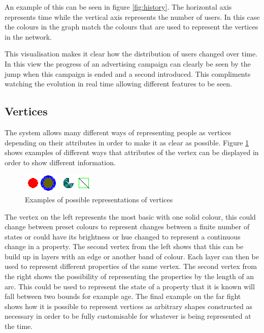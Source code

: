 \documentclass[12pt,a4paper]{article}
\begin{document}
An example of this can be seen in figure \ref{fig:history}. The horizontal axis represents time while the vertical axis represents the number of users. In this case the colours in the graph match the colours that are used to represent the vertices in the network.

This visualisation makes it clear how the distribution of users changed over time. In this view the progress of an advertising campaign can clearly be seen by the jump when this campaign is ended and a second introduced. This compliments watching the evolution in real time allowing different features to be seen.

\subsection{Vertices}
\noindent
The system allows many different ways of representing people as vertices depending on their attributes in order to make it as clear as possible. Figure \ref{fig:vertices} shows examples of different ways that attributes of the vertex can be displayed in order to show different information.

\begin{figure}[htb]
\caption{Examples of possible representations of vertices}
\label{fig:vertices}
\centering
\includegraphics[scale=0.7]{Nodes.png}
\end{figure}

The vertex on the left represents the most basic with one solid colour, this could change between preset colours to represent changes between a finite number of states or could have its brightness or hue changed to represent a continuous change in a property.
The second vertex from the left shows that this can be build up in layers with an edge or another band of colour. Each layer can then be used to represent different properties of the same vertex.
The second vertex from the right shows the possibility of representing the properties by the length of an arc. This could be used to represent the state of a property that it is known will fall between two bounds for example age.
The final example on the far fight shows how it is possible to represent vertices as arbitrary shapes constructed as necessary in order to be fully customisable for whatever is being represented at the time.
\end{document}
